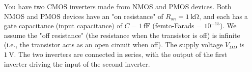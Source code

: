 
You have two CMOS inverters made from NMOS and PMOS devices. Both NMOS and PMOS devices have an "on resistance" of $R_{on}=\SI{1}{\kilo\ohm}$, and each has a gate capacitance (input capacitance) of $C=\SI{1}{\femto\farad}$ (femto-Farads = $10^{-15}$).
We assume the "off resistance" (the resistance when the transistor is off) is infinite (i.e., the transistor acts as an open circuit when off).
The supply voltage $V_{DD}$ is $\SI{1}{\volt}$. The two inverters are connected in series, with the output of the first inverter driving the input of the second inverter.

  



